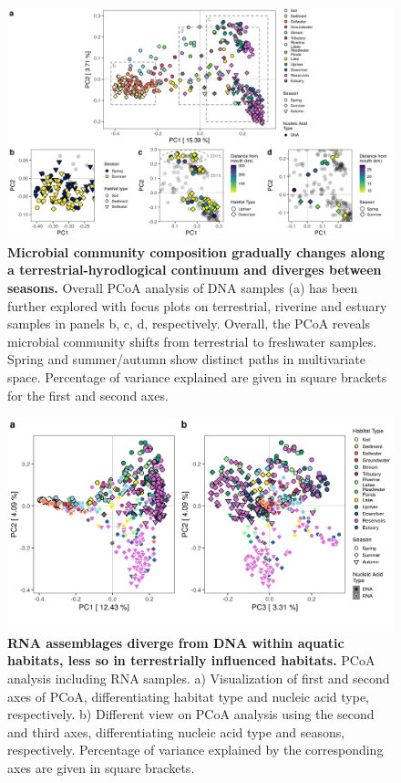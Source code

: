 \documentclass[12pt,a4paper]{article} %
\begin{document}
\begin{figure}[!ht]
\centering
\includegraphics[width=16cm]{../../Figures/Final/PCoA_hellin_DNA_collage.png}
\caption{\textbf{Microbial community composition gradually changes along a terrestrial-hyrodlogical continuum and diverges between seasons.} Overall PCoA analysis of DNA samples (a) has been further explored with focus plots on terrestrial, riverine and estuary samples in panels b, c, d, respectively. Overall, the PCoA reveals microbial community shifts from terrestrial to freshwater samples. Spring and summer/autumn show distinct paths in multivariate space. Percentage of variance explained are given in square brackets for the first and second axes.}
\end{figure}

\begin{figure}[!ht]
\centering
\includegraphics[width=17cm]{../../Figures/Final/PCoA_all_SampleType.png}
\caption{\textbf{RNA assemblages diverge from DNA within aquatic habitats, less so in terrestrially influenced habitats.} PCoA analysis including RNA samples. a) Visualization of first and second axes of PCoA, differentiating habitat type and nucleic acid type, respectively. b) Different view on PCoA analysis using the second and third axes, differentiating nucleic acid type and seasons, respectively. Percentage of variance explained by the corresponding axes are given in square brackets.}
\end{figure}
\end{document}

